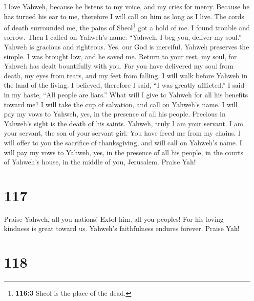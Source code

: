  I love Yahweh, because he listens to my voice, and my
cries for mercy.  Because he has turned his ear to me,
therefore I will call on him as long as I live.  The cords
of death surrounded me, the pains of Sheol\footnote{\textbf{116:3} Sheol
  is the place of the dead.} got a hold of me. I found trouble and
sorrow.  Then I called on Yahweh's name: ``Yahweh, I beg
you, deliver my soul.''  Yahweh is gracious and righteous.
Yes, our God is merciful.  Yahweh preserves the simple. I
was brought low, and he saved me.  Return to your rest, my
soul, for Yahweh has dealt bountifully with you.  For you
have delivered my soul from death, my eyes from tears, and my feet from
falling.  I will walk before Yahweh in the land of the
living.  I believed, therefore I said, ``I was greatly
afflicted.''  I said in my haste, ``All people are
liars.''  What will I give to Yahweh for all his benefits
toward me?  I will take the cup of salvation, and call on
Yahweh's name.  I will pay my vows to Yahweh, yes, in the
presence of all his people.  Precious in Yahweh's sight
is the death of his saints.  Yahweh, truly I am your
servant. I am your servant, the son of your servant girl. You have freed
me from my chains.  I will offer to you the sacrifice of
thanksgiving, and will call on Yahweh's name.  I will pay
my vows to Yahweh, yes, in the presence of all his people,
 in the courts of Yahweh's house, in the middle of you,
Jerusalem. Praise Yah!

\hypertarget{section-109}{%
\section{117}\label{section-109}}

 Praise Yahweh, all you nations! Extol him, all you
peoples!  For his loving kindness is great toward us.
Yahweh's faithfulness endures forever. Praise Yah!

\hypertarget{section-110}{%
\section{118}\label{section-110}}

